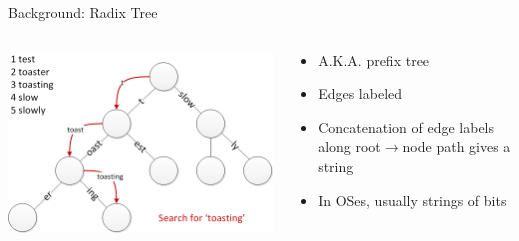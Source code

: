 \documentclass[aspectratio=169]{beamer}
\newcommand{\bi}{\begin{itemize}}
\newcommand{\ei}{\end{itemize}}
\begin{document}
\begin{frame}{Background: Radix Tree}
  \begin{columns}[T]
    \begin{column}{0.5\textwidth}
      \begin{center}
        \includegraphics[scale=0.6]{./figures/Patricia_trie.png}
      \end{center}
    \end{column}
    \begin{column}{0.5\textwidth}
      \bi
    \item A.K.A. prefix tree
    \item Edges labeled
    \item Concatenation of edge labels along root$\rightarrow$node path gives a string
    \item In OSes, usually strings of bits
      \ei
    \end{column}
  \end{columns}
\end{frame}
\end{document}
